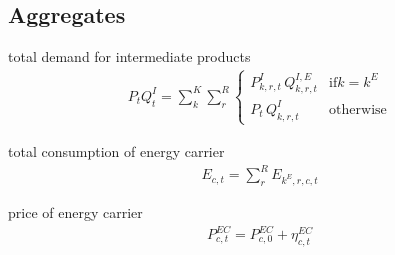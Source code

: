 \subsection{Aggregates}
total demand for intermediate products
\begin{align}\label{eq:aggregationintermediateinputswithenergy}
P_{t} Q^{I}_{t} = \sum_{k}^{K} \sum_{r}^{R} \begin{cases}
			P^{I}_{k,r,t} \, Q^{I,E}_{k,r,t} & \mbox{if} k = k^{E} \\
			P_{t} \, Q^{I}_{k,r,t} & \mbox{otherwise}
			\end{cases}
\end{align}

total consumption of energy carrier
\begin{align}
E_{c,t} = \sum_{r}^{R} E_{k^{E},r,c,t} \label{eq:energycarrieraggregate}
\end{align}

price of energy carrier
\begin{align}
P^{EC}_{c,t} = P^{EC}_{c,0} + \eta^{EC}_{c,t} \label{eq:priceenergycarrier}
\end{align}

